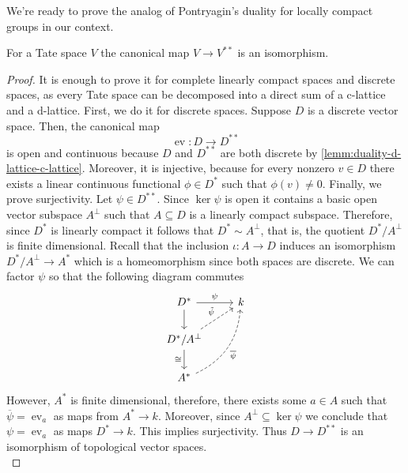 We're ready to prove the analog of Pontryagin's duality for locally compact groups in our context.
\begin{theorem}\label{thm:self-duality}
	For a Tate space $V$ the canonical map $V \to V^{**}$ is an isomorphism.
\end{theorem}
\begin{proof}
	It is enough to prove it for complete linearly compact spaces and discrete spaces, as every Tate space can be decomposed into a direct sum of a c-lattice and a d-lattice. First, we do it for discrete spaces. Suppose $D$ is a discrete vector space. Then, the canonical map
	\[
		\operatorname{ev}\colon D \to D^{**}
	\]
	is open and continuous because $D$ and $D^{**}$ are both discrete by \cref{lemm:duality-d-lattice-c-lattice}. Moreover, it is injective, because for every nonzero $v \in D$ there exists a linear continuous functional $\phi\in D^{*}$ such that $\phi(v)\neq 0$. Finally, we prove surjectivity. Let $\psi \in D^{**}$. Since $\ker \psi$ is open it contains a basic open vector subspace $A^{\perp}$ such that $A \subseteq D$ is a linearly compact subspace. Therefore, since $D^{*}$ is linearly compact it follows that $D^{*} \sim A^{\perp}$, that is, the quotient $D^{*}/A^{\perp}$ is finite dimensional. Recall that the inclusion $\iota\colon A \to D$ induces an isomorphism $D^{*}/A^{\perp} \to A^{*}$ which is a homeomorphism since both spaces are discrete. We can factor $\psi$ so that the following diagram commutes
	\[
	\begin{tikzcd}
		D^{*} \arrow[r, "\psi"] \arrow[d] & k \\
		D^{*}/A^{\perp} \arrow[ru, dashed, "\tilde{\psi}"] \arrow[d, swap, "\cong"] & \\
		A^{*} \arrow[ruu, dashed, swap, bend right, "\overline{\psi}"]
	\end{tikzcd}
	\]
	However, $A^{*}$ is finite dimensional, therefore, there exists some $a \in A$ such that $\overline{\psi} = \operatorname{ev}_{a}$ as maps from $A^{*}\to k$. Moreover, since $A^{\perp} \subseteq \ker\psi$ we conclude that $\psi = \operatorname{ev}_{a}$ as maps $D^{*} \to k$. This implies surjectivity. Thus $D \to D^{**}$ is an isomorphism of topological vector spaces. \\


\end{proof}

